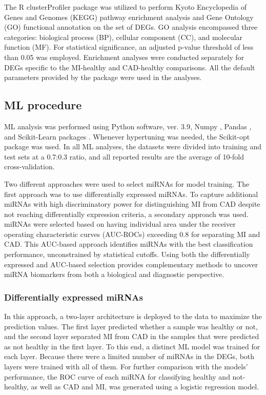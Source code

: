 \documentclass[sn-mathphys,Numbered]{sn-jnl}%
\theoremstyle{thmstyleone}%
\theoremstyle{thmstyletwo}%
\theoremstyle{thmstylethree}%
\begin{document}
The R clusterProfiler package \cite{cluster} was utilized to perform
Kyoto Encyclopedia of Genes and Genomes (KEGG) pathway enrichment
analysis and Gene Ontology (GO) functional annotation on the set of
DEGs. GO analysis encompassed three categories: biological process (BP),
cellular component (CC), and molecular function (MF). For statistical
significance, an adjusted p-value threshold of less than 0.05 was
employed. Enrichment analyses were conducted separately for DEGs
specific to the MI-healthy and CAD-healthy comparisons. All the default
parameters provided by the package were used in the analyses.


\subsection{ML procedure}\label{ml-procedure}

ML analysis was performed using Python software, ver. 3.9, Numpy \cite{numpy}, Pandas \cite{Pandas}, and Scikit-Learn packages
\cite{scikit-learn}. Whenever hypertuning was needed, the Scikit-opt
package \cite{scikitopt} was used. In all ML analyses, the datasets
were divided into training and test sets at a 0.7:0.3 ratio, and all
reported results are the average of 10-fold cross-validation.

Two different approaches were used to select miRNAs for model training.
The first approach was to use differentially expressed miRNAs.
To capture additional miRNAs with high discriminatory power for distinguishing MI from CAD despite not reaching differentially expression criteria, a secondary approach was used. miRNAs were selected based on having individual area under the receiver operating characteristic curves (AUC-ROCs) exceeding 0.8 for separating MI and CAD. This AUC-based approach identifies miRNAs with the best classification performance, unconstrained by statistical cutoffs. Using both the differentially expressed and AUC-based selection provides complementary methods to uncover miRNA biomarkers from both a biological and diagnostic perspective.


\subsubsection{Differentially expressed miRNAs}\label{mirnas-in-degs}

In this approach, a two-layer architecture is deployed to the data to
maximize the prediction values. The first layer predicted whether a
sample was healthy or not, and the second layer separated MI from CAD in
the samples that were predicted as not healthy in the first layer. To
this end, a distinct ML model was trained for each layer. Because there
were a limited number of miRNAs in the DEGs, both layers were trained
with all of them. For further comparison with the models' performance,
the ROC curve of each miRNA for classifying healthy and not-healthy, as
well as CAD and MI, was generated using a logistic regression model.
\end{document}
